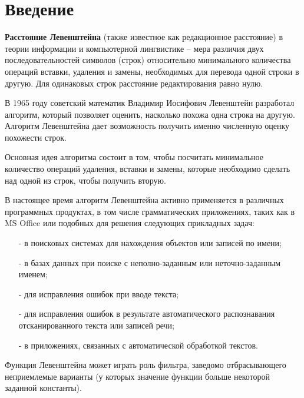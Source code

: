 \documentclass[12pt,a4paper]{report}
\begin{document}

\tableofcontents

\newpage
\chapter*{Введение}

\textbf{Расстояние Левенштейна} (также известное как редакционное расстояние) 
в теории информации и компьютерной лингвистике – мера различия двух последовательностей символов 
(строк) относительно минимального количества операций вставки, удаления и замены, необходимых для
 перевода одной строки в другую. Для одинаковых строк расстояние редактирования равно нулю. 
 
В 1965 году советский математик Владимир Иосифович Левенштейн разработал алгоритм, который позволяет 
оценить, насколько похожа одна строка на другую. Алгоритм Левенштейна дает возможность получить
именно численную оценку похожести строк.

Основная идея алгоритма состоит в том, чтобы посчитать 
минимальное количество операций удаления, вставки и замены, которые необходимо сделать над одной
из строк, чтобы получить вторую. 

В настоящее время алгоритм Левенштейна активно применяется в
различных программных продуктах, в том числе грамматических приложениях, таких как в MS Office
или подобных для решения следующих прикладных задач: 
\begin{enumerate}
    \item[-] в поисковых системах для нахождения объектов или записей по имени;
    \item[-] в базах данных при поиске с неполно-заданным или неточно-заданным именем; 
    \item[-] для исправления ошибок при вводе текста;
    \item[-] для исправления ошибок в результате автоматического распознавания отсканированного текста или записей речи;
    \item[-] в приложениях, связанных с автоматической обработкой текстов.
\end{enumerate}

Функция Левенштейна может играть роль фильтра,
заведомо отбрасывающего неприемлемые варианты (у которых значение функции больше некоторой заданной константы).


    
\end{document}
